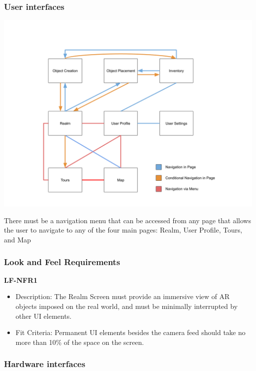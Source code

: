 \documentclass{article}
\begin{document}
\subsubsection{User interfaces}

\begin{center}
    \includegraphics[scale=0.4]{OtherDiagrams/ui_flow.png}
\end{center}

There must be a navigation menu that can be accessed from any page that allows the user to navigate to any of the four main pages: Realm, User Profile, Tours, and Map

\subsubsection{Look and Feel Requirements}

\textbf{LF-NFR1}

\begin{itemize}
    \item Description: The Realm Screen must provide an immersive view of AR objects imposed on the real world, and must be minimally interrupted by other UI elements. 
    \item Fit Criteria: Permanent UI elements besides the camera feed should take no more than 10\% of the space on the screen.
\end{itemize}




\subsubsection{Hardware interfaces}
\end{document}
